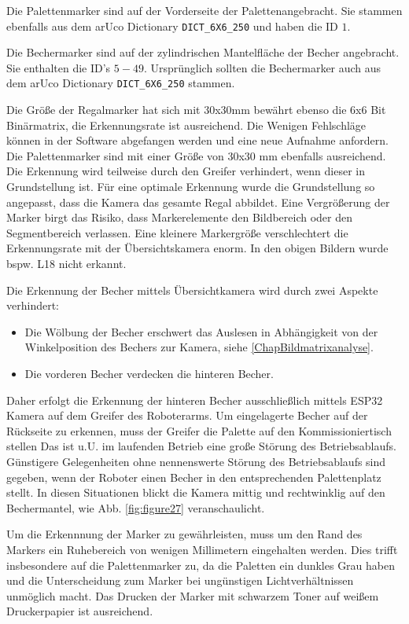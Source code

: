     Die Palettenmarker sind auf der Vorderseite der Palettenangebracht. Sie stammen ebenfalls aus dem arUco Dictionary \verb|DICT_6X6_250| und haben die ID $1$.

    Die Bechermarker sind auf der zylindrischen Mantelfläche der Becher angebracht. Sie enthalten die ID's $5-49$.
    Ursprünglich sollten die Bechermarker auch aus dem arUco Dictionary \verb|DICT_6X6_250| stammen.

    Die Größe der Regalmarker hat sich mit 30x30mm bewährt ebenso die 6x6 Bit Binärmatrix, die Erkennungsrate ist ausreichend. 
    Die Wenigen Fehlschläge können in der Software abgefangen werden und eine neue Aufnahme anfordern.
    Die Palettenmarker sind mit einer Größe von 30x30 mm ebenfalls ausreichend. 
    Die Erkennung wird teilweise durch den Greifer verhindert, wenn dieser in Grundstellung ist. 
    Für eine optimale Erkennung wurde die Grundstellung so angepasst, dass die Kamera das gesamte Regal abbildet.
    Eine Vergrößerung der Marker birgt das Risiko, dass Markerelemente den Bildbereich oder den Segmentbereich verlassen. 
    Eine kleinere Markergröße verschlechtert die Erkennungsrate mit der Übersichtskamera enorm. 
    In den obigen Bildern wurde bspw. L18 nicht erkannt.
    
    Die Erkennung der Becher mittels Übersichtkamera wird durch zwei Aspekte verhindert:
    \begin{itemize}
        \item Die Wölbung der Becher erschwert das Auslesen in Abhängigkeit von der Winkelposition des Bechers zur Kamera, siehe \ref{ChapBildmatrixanalyse}.
        \item Die vorderen Becher verdecken die hinteren Becher.
    \end{itemize}

    Daher erfolgt die Erkennung der hinteren Becher ausschließlich mittels ESP32 Kamera auf dem Greifer des Roboterarms.
    Um eingelagerte Becher auf der Rückseite zu erkennen, muss der Greifer die Palette auf den Kommissioniertisch stellen
    Das ist u.U. im laufenden Betrieb eine große Störung des Betriebsablaufs.
    Günstigere Gelegenheiten ohne nennenswerte Störung des Betriebsablaufs sind gegeben, wenn der Roboter einen Becher in den entsprechenden Palettenplatz stellt.
    In diesen Situationen blickt die Kamera mittig und rechtwinklig auf den Bechermantel, wie Abb. \ref{fig:figure27} veranschaulicht.

    Um die Erkennnung der Marker zu gewährleisten, muss um den Rand des Markers ein \glqq Ruhebereich \grqq von wenigen Millimetern eingehalten werden.
    Dies trifft insbesondere auf die Palettenmarker zu, da die Paletten ein dunkles Grau haben und die Unterscheidung zum Marker bei ungünstigen Lichtverhältnissen unmöglich macht.
    Das Drucken der Marker mit schwarzem Toner auf weißem Druckerpapier ist ausreichend.

